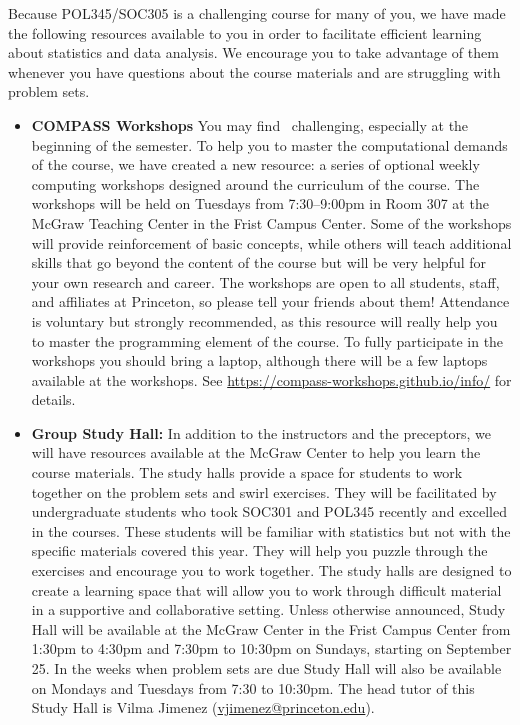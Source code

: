 \documentclass[11pt]{article}
\begin{document}
Because POL345/SOC305 is a challenging course for many of you, we have
made the following resources available to you in order to facilitate
efficient learning about statistics and data analysis.  We encourage
you to take advantage of them whenever you have questions about the
course materials and are struggling with problem sets.
\begin{itemize}
\item {\bf \R{} COMPASS Workshops} You may find \R\ challenging,
  especially at the beginning of the semester. To help you to master
  the computational demands of the course, we have created a new
  resource: a series of optional weekly computing workshops designed
  around the curriculum of the course. The workshops will be held on
  Tuesdays from 7:30--9:00pm in Room 307 at the McGraw Teaching Center
  in the Frist Campus Center. Some of the workshops will provide
  reinforcement of basic concepts, while others will teach additional
  skills that go beyond the content of the course but will be very
  helpful for your own research and career. The workshops are open to
  all students, staff, and affiliates at Princeton, so please tell
  your friends about them!  Attendance is voluntary but strongly
  recommended, as this resource will really help you to master the
  programming element of the course.  To fully participate in the
  workshops you should bring a laptop, although there will be a few
  laptops available at the workshops.  See
  \url{https://compass-workshops.github.io/info/} for details.

\item {\bf Group Study Hall:} In addition to the instructors and the
  preceptors, we will have resources available at the McGraw Center to
  help you learn the course materials. The study halls provide a space
  for students to work together on the problem sets and swirl
  exercises. They will be facilitated by undergraduate students who
  took SOC301 and POL345 recently and excelled in the courses. These
  students will be familiar with statistics but not with the specific
  materials covered this year. They will help you puzzle through the
  exercises and encourage you to work together. The study halls are
  designed to create a learning space that will allow you to work
  through difficult material in a supportive and collaborative
  setting. Unless otherwise announced, Study Hall will be available at
  the McGraw Center in the Frist Campus Center from 1:30pm to 4:30pm
  and 7:30pm to 10:30pm on Sundays, starting on September 25. In the
  weeks when problem sets are due Study Hall will also be available on
  Mondays and Tuesdays from 7:30 to 10:30pm. The head tutor of this
  Study Hall is Vilma Jimenez
  (\href{mailto:vjimenez@princeton.edu}{vjimenez@princeton.edu}).


\end{itemize}
\end{document}
